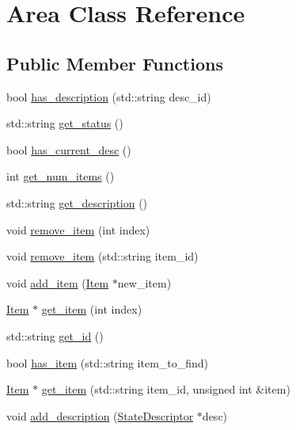 \hypertarget{class_area}{
\section{\-Area \-Class \-Reference}
\label{class_area}
}
\subsection*{\-Public \-Member \-Functions}
\begin{DoxyCompactItemize}
\item 
bool \hyperlink{class_area_a928ac4f85119316a126beafc575a5f84}{has\-\_\-description} (std\-::string desc\-\_\-id)
\item 
std\-::string \hyperlink{class_area_ac3f89059fe2ef23610dc3a5650c94c0d}{get\-\_\-status} ()
\item 
bool \hyperlink{class_area_a7a2701d4527e084ea7f8944925b539d7}{has\-\_\-current\-\_\-desc} ()
\item 
int \hyperlink{class_area_aee8135f25247d5e06dc0b28bf8cabcba}{get\-\_\-num\-\_\-items} ()
\item 
std\-::string \hyperlink{class_area_acab405d06547438ee02b3d8b9a2ff013}{get\-\_\-description} ()
\item 
void \hyperlink{class_area_a687234da51ac6da40d2aee426926dfcd}{remove\-\_\-item} (int index)
\item 
void \hyperlink{class_area_afee6d30b9d43a9960845e13f943584ad}{remove\-\_\-item} (std\-::string item\-\_\-id)
\item 
void \hyperlink{class_area_a8f4693277743a9dbc6ac0212fc02c86f}{add\-\_\-item} (\hyperlink{class_item}{\-Item} $\ast$new\-\_\-item)
\item 
\hyperlink{class_item}{\-Item} $\ast$ \hyperlink{class_area_a11b2c96e1abfc4146e6d8c2a8da83d34}{get\-\_\-item} (int index)
\item 
std\-::string \hyperlink{class_area_a19d6622fb6fb95f6ba5fb212e26728e6}{get\-\_\-id} ()
\item 
bool \hyperlink{class_area_adcc60d9dea5808c8bb0e21d672667b29}{has\-\_\-item} (std\-::string item\-\_\-to\-\_\-find)
\item 
\hyperlink{class_item}{\-Item} $\ast$ \hyperlink{class_area_a0e145e01b38d86c04e41b7202200322a}{get\-\_\-item} (std\-::string item\-\_\-id, unsigned int \&item)
\item 
void \hyperlink{class_area_a27101dd552a05cebb467f108a5246278}{add\-\_\-description} (\hyperlink{class_state_descriptor}{\-State\-Descriptor} $\ast$desc)

\end{DoxyCompactItemize}
